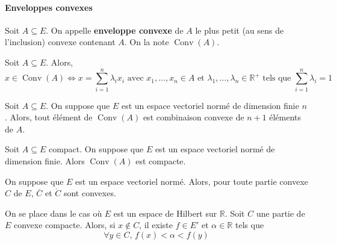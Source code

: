   \paragraph{Enveloppes convexes}


  \begin{definition}
    Soit $A \subseteq E$. On appelle \textbf{enveloppe convexe} de $A$ le plus petit (au sens de l'inclusion) convexe contenant $A$. On la note $\operatorname{Conv}(A)$.
  \end{definition}

  \begin{proposition}
    Soit $A \subseteq E$. Alors,
    \[ x \in \operatorname{Conv}(A) \iff x = \sum_{i=1}^{n} \lambda_i x_i \text{ avec } x_1, \dots, x_n \in A \text{ et } \lambda_1, \dots, \lambda_n \in \mathbb{R}^+ \text{ tels que } \sum_{i=1}^n \lambda_i = 1 \]
  \end{proposition}


  \begin{theorem}[Carathéodory]
    Soit $A \subseteq E$. On suppose que $E$ est un espace vectoriel normé de dimension finie $n$. Alors, tout élément de $\operatorname{Conv}(A)$ est combinaison convexe de $n+1$ éléments de $A$.
  \end{theorem}

  \begin{application}
    Soit $A \subseteq E$ compact. On suppose que $E$ est un espace vectoriel normé de dimension finie. Alors $\operatorname{Conv}(A)$ est compacte.
  \end{application}

  \begin{proposition}
    On suppose que $E$ est un espace vectoriel normé. Alors, pour toute partie convexe $C$ de $E$, $\overline{C}$ et $\mathring{C}$ sont convexes.
  \end{proposition}


  \begin{theorem}
    On se place dans le cas où $E$ est un espace de Hilbert sur $\mathbb{R}$. Soit $C$ une partie de $E$ convexe compacte. Alors, si $x \notin C$, il existe $f \in E'$ et $\alpha \in \mathbb{R}$ tels que
    \[ \forall y \in C, \, f(x) < \alpha < f(y) \]
  \end{theorem}


